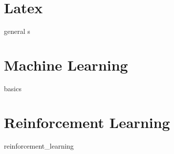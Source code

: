 \documentclass[draft]{book}
\numberwithin{equation}{section}
\begin{document}
\tableofcontents

\chapter{Latex}

{general}
s
\chapter{Machine Learning}

{basics}

\chapter{Reinforcement Learning}
{reinforcement_learning}
\end{document}

